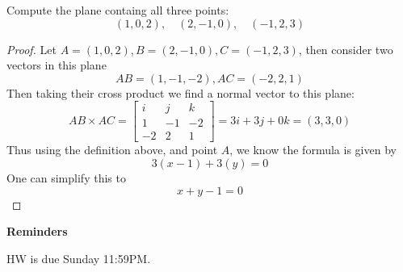 \documentclass[openany]{book}
\begin{document}
\begin{prob}
    Compute the plane containg all three points:
    \begin{equation*}
        (1,0,2), \quad (2, -1, 0), \quad (-1, 2, 3)
    \end{equation*}
\end{prob}
\begin{proof}
    Let $A=(1,0,2), B=(2, -1, 0), C=(-1, 2, 3)$, then consider two vectors in this plane 
    \begin{equation*}
        AB=(1,-1,-2), AC=(-2,2,1)
    \end{equation*}
    Then taking their cross product we find a normal vector to this plane:
    \begin{equation*}
        AB\times AC=\begin{bmatrix}
            i&j&k\\
            1&-1&-2\\
            -2&2&1
        \end{bmatrix}=3i+3j+0k=(3,3,0)
    \end{equation*}
    Thus using the definition above, and point $A$, we know the formula is given by 
    \begin{equation*}
        3(x-1)+3(y)=0
    \end{equation*}
    One can simplify this to 
    \begin{equation*}
        x+y-1=0
    \end{equation*}
\end{proof}


\textbf{Reminders}

HW is due Sunday 11:59PM.

\end{document}
